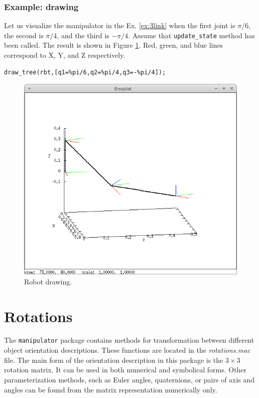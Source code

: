 \documentclass{article}
\begin{document}
\subsubsection{Example: drawing}

Let us visualize the manipulator in the Ex. \ref{ex:3link} when the first joint is $\pi/6$, the second is $\pi/4$, and the third is $-\pi/4$. Assume that \texttt{update\_state} method has been called. The result is shown in Figure \ref{fig:drawing}. Red, green, and blue lines correspond to X, Y, and Z respectively.
\begin{verbatim}
draw_tree(rbt,[q1=%pi/6,q2=%pi/4,q3=-%pi/4]);
\end{verbatim}

\begin{figure}[t]
    \centering
    \includegraphics[width=0.8\linewidth]{img/robot_state.png}
    \caption{Robot drawing.}
    \label{fig:drawing}
\end{figure}

\section{Rotations}

The \texttt{manipulator} package contains methods for transformation between different object orientation descriptions. These functions are located in the \textit{rotations.mac} file. The main form of the orientation description in this package is the $3 \times 3$ rotation matrix. It can be used in both numerical and symbolical forms. Other parameterization methods, such as Euler angles, quaternions, or pairs of axis and angles can be found from the matrix representation numerically only.  
\end{document}
